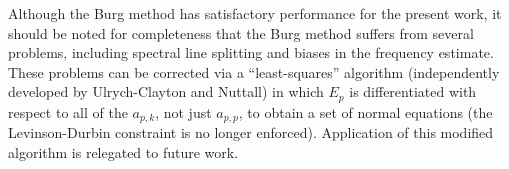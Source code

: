 Although the Burg method has satisfactory performance for the present work,
it should be noted for completeness that
the Burg method suffers from several problems,
including spectral line splitting and biases in the frequency estimate.
These problems can be corrected via
a ``least-squares'' algorithm
(independently developed by Ulrych-Clayton and Nuttall)
in which $E_p$ is differentiated with respect to all of the $a_{p,k}$,
not just $a_{p,p}$,
to obtain a set of normal equations
(the Levinson-Durbin constraint is no longer enforced).
Application of this modified algorithm
is relegated to future work.




